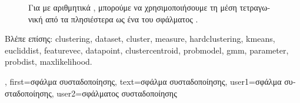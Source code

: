 {{\begin{figure}[H]
		{
		\caption{\foreignlanguage{greek}{Για}  \foreignlanguage{greek}{με αριθμητικά} , 
			\foreignlanguage{greek}{μπορούμε να χρησιμοποιήσουμε τη μέση τετραγωνική}  \foreignlanguage{greek}{από τα 
			πλησιέστερα}  \foreignlanguage{greek}{ως ένα}  \foreignlanguage{greek}{του σφάλματος} 
			.\label{fig_clustering_error_dict}} }
		\end{figure}
	 	\foreignlanguage{greek}{Βλέπε επίσης:} \gls{clustering}, \gls{dataset}, \gls{cluster}, \gls{measure}, \gls{hardclustering}, \gls{kmeans}, \gls{eucliddist}, 
		\gls{featurevec}, \gls{datapoint}, \gls{clustercentroid}, \gls{probmodel}, \gls{gmm}, \gls{parameter}, \gls{probdist}, \gls{maxlikelihood}. }, 
	first={\foreignlanguage{greek}{σφάλμα συσταδοποίησης}},
	text={\foreignlanguage{greek}{σφάλμα συσταδοποίησης}},
	user1={\foreignlanguage{greek}{σφάλμα συσταδοποίησης}},
	user2={\foreignlanguage{greek}{σφάλματος συσταδοποίησης}}
}

